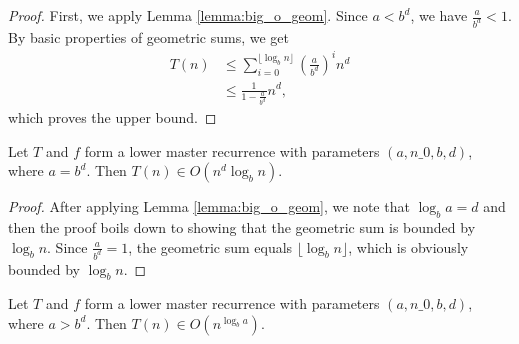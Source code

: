 \begin{proof}
    \leanok
    First, we apply Lemma \ref{lemma:big_o_geom}. Since $a < b^d$, we have 
    $\frac{a}{b^d} < 1$. By basic properties of geometric sums, we get
    \begin{align*}
        T(n) &\leq \sum_{i=0}^{\lfloor \log_b{n} \rfloor} 
                        (\frac{a}{b^d})^i n^d \\
             &\leq \frac{1}{1 - \frac{a}{b^d}} n^d,
    \end{align*}
    which proves the upper bound.
\end{proof}

\begin{theorem}
    \label{thm:lower_master_rec_big_o_of_eq}
    \leanok
    Let $T$ and $f$ form a lower master recurrence with parameters
    $(a, n\_0, b, d)$, where $a = b^d$. Then $T(n) \in O(n^d \log_b{n})$.
\end{theorem}

\begin{proof}
    \leanok
    After applying Lemma \ref{lemma:big_o_geom}, we note that $\log_b{a} = d$
    and then the proof boils down to showing that the geometric sum is bounded 
    by $\log_b{n}$. Since $\frac{a}{b^d} = 1$, the geometric sum equals
    $\lfloor \log_b{n} \rfloor$, which is obviously bounded by $\log_b{n}$.
\end{proof}

\begin{theorem}
    \label{thm:lower_master_rec_big_o_of_gt}
    \leanok
    Let $T$ and $f$ form a lower master recurrence with parameters
    $(a, n\_0, b, d)$, where $a > b^d$. Then $T(n) \in O(n^{\log_b{a}})$.
\end{theorem}

